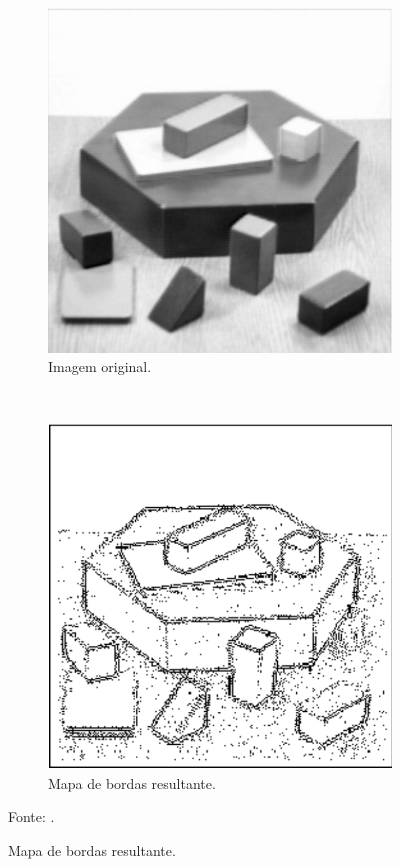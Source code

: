 \begin{figure}[H]
   \caption{Segmentação com operador Laplaciano.}
   \centering
   \label{segment:fig:8}
    \begin{subfigure}[t]{0.45\textwidth}
        \centering
        \includegraphics[width=1\linewidth]{recursos/imagens/image_seg/ol1.png}
        \caption{Imagem original.}
        \label{segment:fig:8.1}
    \end{subfigure}%
    ~ 
    \begin{subfigure}[t]{0.45\textwidth}
        \centering
        \includegraphics[width=1\linewidth]{recursos/imagens/image_seg/lp2.png}
        \caption{Mapa de bordas resultante.}
        \label{segment:fig:8.2}
    \end{subfigure}%

    Fonte: \cite{pedrini2008analise}.
\end{figure}

